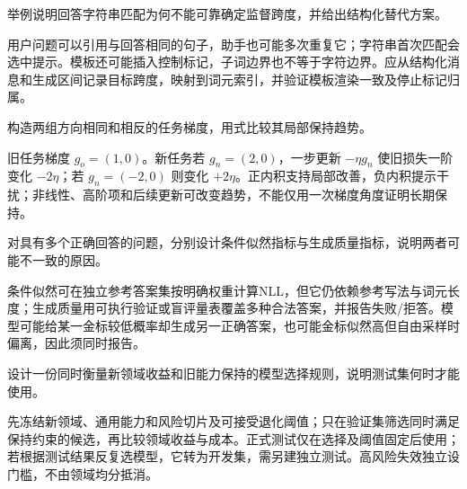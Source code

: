 \begin{exercises}
\begin{exercise} 举例说明回答字符串匹配为何不能可靠确定监督跨度，并给出结构化替代方案。

\begin{solution}
用户问题可以引用与回答相同的句子，助手也可能多次重复它；字符串首次匹配会选中提示。模板还可能插入控制标记，子词边界也不等于字符边界。应从结构化消息和生成区间记录目标跨度，映射到词元索引，并验证模板渲染一致及停止标记归属。
\end{solution}
\end{exercise}

\begin{exercise} 构造两组方向相同和相反的任务梯度，用式比较其局部保持趋势。

\begin{solution}
旧任务梯度 $g_o=(1,0)$。新任务若 $g_n=(2,0)$，一步更新 $-\eta g_n$ 使旧损失一阶变化 $-2\eta$；若 $g_n=(-2,0)$ 则变化 $+2\eta$。正内积支持局部改善，负内积提示干扰；非线性、高阶项和后续更新可改变趋势，不能仅用一次梯度角度证明长期保持。
\end{solution}
\end{exercise}

\begin{exercise} 对具有多个正确回答的问题，分别设计条件似然指标与生成质量指标，说明两者可能不一致的原因。

\begin{solution}
条件似然可在独立参考答案集按明确权重计算NLL，但它仍依赖参考写法与词元长度；生成质量用可执行验证或盲评量表覆盖多种合法答案，并报告失败/拒答。模型可能给某一金标较低概率却生成另一正确答案，也可能金标似然高但自由采样时偏离，因此须同时报告。
\end{solution}
\end{exercise}

\begin{exercise} 设计一份同时衡量新领域收益和旧能力保持的模型选择规则，说明测试集何时才能使用。

\begin{solution}
先冻结新领域、通用能力和风险切片及可接受退化阈值；只在验证集筛选同时满足保持约束的候选，再比较领域收益与成本。正式测试仅在选择及阈值固定后使用；若根据测试结果反复选模型，它转为开发集，需另建独立测试。高风险失效独立设门槛，不由领域均分抵消。
\end{solution}
\end{exercise}

\end{exercises}
